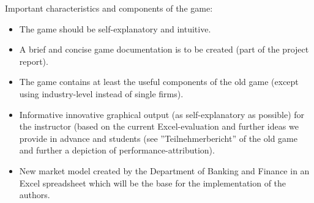 Important characteristics and components of the game:
\begin{itemize}
  \item The game should be self-explanatory and intuitive.
  \item A brief and concise game documentation is to be created (part of the project report).
  \item The game contains at least the useful components of the old game (except using industry-level instead of single firms).
  \item Informative innovative graphical output (as self-explanatory as possible) for the instructor (based on the current Excel-evaluation and further ideas we provide in advance and students (see ''Teilnehmerbericht'' of the old game and further a depiction of performance-attribution).
  \item New market model created by the Department of Banking and Finance in an Excel spreadsheet which will be the base for the implementation of the authors.
\end{itemize}

